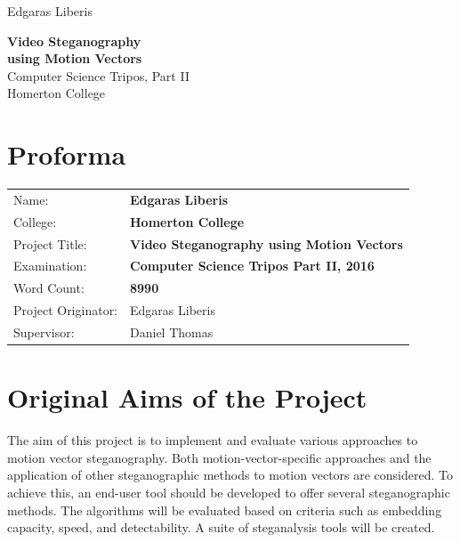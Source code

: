 \documentclass[12pt,british,twoside,notitlepage,usenames,dvipsnames,hypens,final]{report}
\numberwithin{equation}{section}
\numberwithin{figure}{section}
\begin{document}
\pagestyle{empty}

\hfill{\LARGE Edgaras Liberis}

\vspace*{60mm}
\begin{center}
\Huge
{\bf Video Steganography \\ using Motion Vectors} \\
\vspace*{10mm}
{ \sc \LARGE
Computer Science Tripos, Part II \\
Homerton College \\
}
\vspace*{10mm}
\the\year 
\end{center}

\cleardoublepage

\setcounter{page}{3}
\pagestyle{plain}

{\section*{\Huge Proforma}}

{\large
\begin{tabular}{ll}
Name:               & \bf Edgaras Liberis                          \\
College:            & \bf Homerton College                         \\
Project Title:      & \bf Video Steganography using Motion Vectors \\
Examination:        & \bf Computer Science Tripos Part II, 2016    \\
Word Count:         & \bf 8990\footnotemark[1]                     \\
Project Originator: & Edgaras Liberis                              \\
Supervisor:         & Daniel Thomas                                \\ 
\end{tabular}
}
\vspace{0.5cm}

\section*{Original Aims of the Project}

The aim of this project is to implement and evaluate various approaches to motion vector steganography. Both motion-vector-specific approaches and the application of other steganographic methods to motion vectors are considered. To achieve this, an end-user tool should be developed to offer several steganographic methods. The algorithms will be evaluated based on criteria such as embedding capacity, speed, and detectability. A suite of steganalysis tools will be created.  
\end{document}
